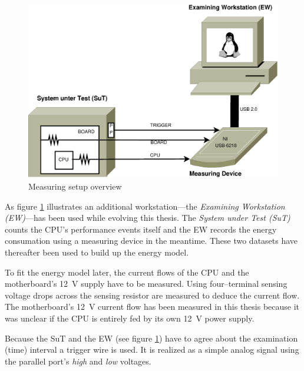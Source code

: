 \label{sec:design}


\label{sec:big-pic}

\begin{figure}
  \centering
    \includegraphics[width=\textwidth]{fig/measuring-overview.eps}
  \caption{Measuring setup overview}
  \label{fig:overview}
\end{figure}

As figure \ref{fig:overview} illustrates an additional workstation---the
\emph{Examining Workstation (EW)}---has been used while evolving this thesis.
The \emph{System under Test (SuT)} counts the CPU's performance events itself
and the EW records the energy consumation using a measuring device in the
meantime. These two datasets have thereafter been used to build up the energy
model.


\label{sec:measuring-setup}

To fit the energy model later, the current flows of the CPU and the
motherboard's \SI{12}{\volt} supply have to be measured. Using four--terminal
sensing \cite{wiki:FTS} voltage drops across the sensing resistor are
measured to deduce the current flow. The motherboard's \SI{12}{\volt} current
flow has been measured in this thesis because it was unclear if the CPU is
entirely fed by its own \SI{12}{\volt} power supply.

Because the SuT and the EW (see figure \ref{fig:overview}) have to agree about
the examination (time) interval a trigger wire is used. It is realized as a
simple analog signal using the parallel port's \emph{high} and \emph{low}
voltages.

